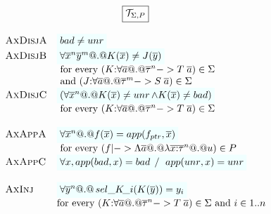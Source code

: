\documentclass[preprint,nocopyrightspace,draft]{sigplanconf}
\begin{document}
\begin{figure}\small
\[\begin{array}{c}
\ruleform{\Th{\Sigma}{P}} \\ \\ 
\begin{array}{lll} 
 \textsc{AxDisjA} & \formula{\bad \neq \unr}  \\ 
 \textsc{AxDisjB} & \formula{\forall \oln{x}{n}\oln{y}{m} @.@ K(\ol{x}) \neq J(\ol{y})} \\ 
                  & \text{ for every } (K{:}\forall\as @.@ \oln{\tau}{n} -> T\;\as) \in \Sigma \\ 
                  & \text{ and } (J{:}\forall\as @.@ \oln{\tau}{m} -> S\;\as) \in \Sigma \\
 \textsc{AxDisjC} & \formula{(\forall \oln{x}{n} @.@ K(\ol{x}) \neq \unr \land K(\ol{x}) \neq \bad)} \\ 
                  & \text{ for every } (K{:}\forall\as @.@ \oln{\tau}{n} -> T\;\as) \in \Sigma \\ \\
 \textsc{AxAppA}  & \formula{\forall \oln{x}{n} @.@ f(\ol{x}) = app(f_{ptr},\xs)} \\
                  & \text{ for every } (f |-> \Lambda\as @.@ \lambda\oln{x{:}\tau}{n} @.@ u) \in P \\
 \textsc{AxAppC}  & \formula{\forall x, app(\bad,x) = \bad \; /\ \; app(\unr,x) = \unr}    \\ \\
 \textsc{AxInj}   & \formula{\forall \oln{y}{n} @.@ \sel{K}{i}(K(\ys)) = y_i} \\ 
                  & \text{for every } (K{:}\forall\as @.@ \oln{\tau}{n} -> T\;\as) \in \Sigma \text{ and } i \in 1..n \\ \\

\end{array}
\end{array}\]
\end{figure}
\end{document}
